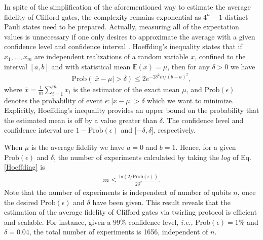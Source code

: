 \documentclass[prl,twocolumn,showpacs]{revtex4-1}
\begin{document}
In spite of the simplification of the aforementioned way to estimate the average fidelity of Clifford gates, the complexity remains exponential as $4^n-1$ distinct Pauli states need to be prepared. Actually, measuring all of the expectation values is unnecessary if one only desires to approximate the average with a given confidence level and confidence interval \cite{Emerson2007}.  Hoeffding's inequality \cite{Venkatesh2012} states that if $x_1, . . . ,x_m$ are independent realizations of a random variable $x$, confined to the interval $[a, b]$ and with statistical mean $\mathbb{E}(x) = \mu$, then for any $\delta >0$ we have
\begin{align} \label{Hoeffding}
\text{Prob} \left( |\bar{x}-\mu| > \delta \right) \leq 2e^{-2\delta^2m/(b-a)^2},
\end{align}
where $\bar{x} = \frac{1}{m}\sum_{i=1}^m x_i$ is the estimator of the exact mean $\mu$, and $\text{Prob}(\epsilon)$ denotes the probability of event $\epsilon: |\bar{x}-\mu| > \delta$ which we want to minimize. Explicitly,  Hoeffding's inequality provides an upper bound on the probability that the estimated mean is off by a value greater than $\delta$. The confidence level and confidence interval are  $1-\text{Prob}(\epsilon)$ and [$-\delta, \delta$], respectively.

{When $\mu$ is the  average fidelity we have  $a=0$ and $b=1$.} Hence, for a given $\text{Prob}(\epsilon)$ and $\delta$, the number of experiments {calculated  by taking the $log$  of Eq. \eqref{Hoeffding} is}
\begin{align} \label{exp_number}
m\leq \frac{\text{ln}(2/\text{Prob}(\epsilon))}{2\delta^2}.
\end{align}
 Note that the number of experiments is independent of number of qubits  $n$, once the desired $\text{Prob}(\epsilon)$ and $\delta$ have been given. This result reveals that the estimation of the average fidelity of Clifford gates via twirling protocol is efficient and scalable. For instance, given a $99\%$ confidence level, \emph{i.e.,} $\text{Prob}(\epsilon)=1\%$ and $\delta = 0.04$, the total number of experiments is 1656, {independent of $n$}.
\end{document}
